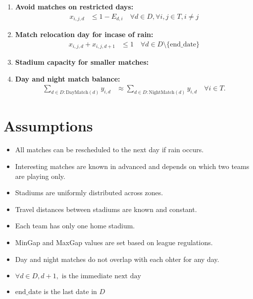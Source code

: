 \documentclass[a4paper, 12pt]{article}
\begin{document}
\begin{enumerate}
    \item \textbf{Avoid matches on restricted days:}
    \begin{align*}
        x_{i,j,d} &\leq 1 - E_{d,i} \quad \forall d \in D, \forall i,j \in T, i \neq j
    \end{align*}

    \item \textbf{Match relocation day for incase of rain:}
    \begin{align*}
        x_{i,j,d} + x_{i,j,d+1} &\leq 1 \quad \forall d \in D \setminus \{ \text{end\_date} \}
    \end{align*}

    \item \textbf{Stadium capacity for smaller matches:}


    \item \textbf{Day and night match balance:}
    \begin{align*}
        \sum_{d \in D: \text{DayMatch}(d)} y_{i,d} &\approx \sum_{d \in D: \text{NightMatch}(d)} y_{i,d} \quad \forall i \in T.
    \end{align*}
\end{enumerate}

\section*{Assumptions}
\begin{itemize}
    \item All matches can be rescheduled to the next day if rain occurs.
    \item Interesting matches are known in advanced and depends on which two teams are playing only.
    \item Stadiums are uniformly distributed across zones.
    \item Travel distances between stadiums are known and constant.
    \item Each team has only one home stadium.
    \item MinGap and MaxGap values are set based on league regulations.
    \item Day and night matches do not overlap with each ohter for any day.
    \item $\forall d \in D, d+1, \text{ is the immediate next day}$ 
    \item $\text{end\_date}$ is the last date in $D$
\end{itemize}
\end{document}
